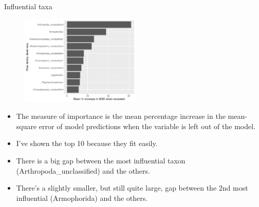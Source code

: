 \documentclass{beamer}
\begin{document}
\begin{frame}{Influential taxa}

  \begin{center}
    \begin{figure}
      \includegraphics[width=2.25in]{w_ribs/families_rib_PercIncMSE_barchart}
    \end{figure}
  \end{center}
  
  \vspace{0.1in}
  
  {\scriptsize
    \begin{itemize}
    \item The measure of importance is the mean percentage increase in
      the mean-square error of model predictions when the variable is
      left out of the model.
    \item I've shown the top 10 because they fit easily.
    \item There is a big gap between the most influential taxon
      (Arthropoda\_unclassified) and the others.
    \item There's a slightly smaller, but still quite large, gap
      between the 2nd most influential (Armophorida) and the others.
    \end{itemize}
  }

\end{frame}
\end{document}
